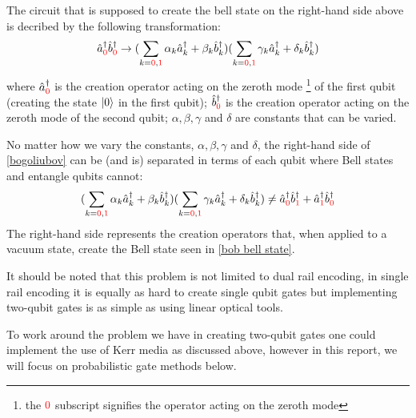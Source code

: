 The circuit that is supposed to create the bell state on the right-hand side above is decribed by the following transformation:
\begin{equation} \label{bogoliubov}
    \hat{a}^{\dag}_{\color{red}0}\hat{b}^{\dag}_{\color{red}0} \rightarrow (\sum\limits_{k={\color{red}0},{\color{red}1}}\alpha_k\hat{a}^{\dag}_k + \beta_k\hat{b}^{\dag}_k)(\sum\limits_{k={\color{red}0},{\color{red}1}}\gamma_k\hat{a}^{\dag}_k + \delta_k\hat{b}^{\dag}_k)
\end{equation} \cite{Kok:2005jip}
where $\hat{a}^\dag_{\color{red}0}$ is the creation operator acting on the zeroth mode \footnote{the ${\color{red}0}$ subscript signifies the operator acting on the zeroth mode} of the first qubit (creating the state $\ket{0}$ in the first qubit); $\hat{b}^\dag_{\color{red}0}$ is the creation operator acting on the zeroth mode of the second qubit; $\alpha, \beta, \gamma$ and $\delta$ are constants that can be varied.
\par
No matter how we vary the constants,  $\alpha, \beta, \gamma$ and $\delta$, the right-hand side of \cref{bogoliubov} can be (and is) separated in terms of each qubit where Bell states and entangle qubits cannot:
\begin{equation}
    (\sum\limits_{k={\color{red}0},{\color{red}1}}\alpha_k\hat{a}^{\dag}_k + \beta_k\hat{b}^{\dag}_k)(\sum\limits_{k={\color{red}0},{\color{red}1}}\gamma_k\hat{a}^{\dag}_k + \delta_k\hat{b}^{\dag}_k) \neq \hat{a}^{\dag}_{\color{red}0}\hat{b}^{\dag}_{\color{red}1} + \hat{a}^{\dag}_{\color{red}1}\hat{b}^{\dag}_{\color{red}0}
\end{equation}
The right-hand side represents the creation operators that, when applied to a vacuum state, create the Bell state seen in \cref{bob bell state}.

It should be noted that this problem is not limited to dual rail encoding, in single rail encoding it is equally as hard to create single qubit gates but implementing two-qubit gates is as simple as using linear optical tools.

To work around the problem we have in creating two-qubit gates one could implement the use of Kerr media as discussed above, however in this report, we will focus on probabilistic gate methods below.


